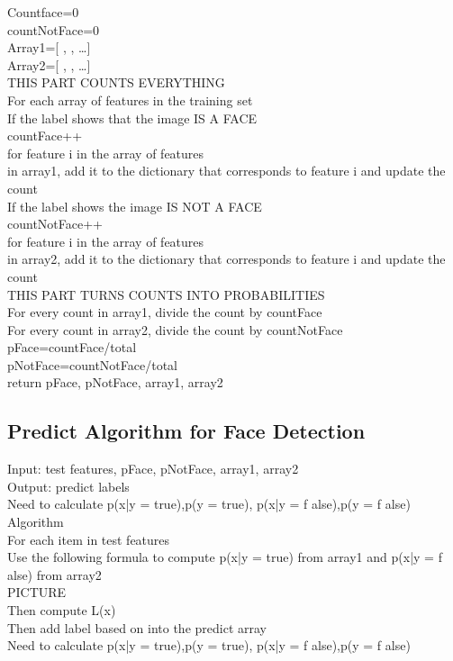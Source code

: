 \documentclass{article}
\begin{document}
Countface=0\\
countNotFace=0\\
Array1=[ {} ,  {}, {}…]\\
Array2=[ {} ,  {}, {}…]\\
THIS PART COUNTS EVERYTHING\\
For each array of features in the training set\\
	If the label shows that the image IS A FACE\\
		countFace++\\
		for feature i in the array of features\\
			in array1, add it to the dictionary that corresponds to feature i and update the count\\
	If the label shows the image IS NOT A FACE\\
		countNotFace++\\
		for feature i in the array of features\\
			in array2, add it to the dictionary that corresponds to feature i and update the count\\
THIS PART TURNS COUNTS INTO PROBABILITIES\\
For every count in array1, divide the count by countFace\\
For every count in array2, divide the count by countNotFace\\
pFace=countFace/total\\
pNotFace=countNotFace/total\\
return pFace, pNotFace, array1, array2\\ 
\subsection{Predict Algorithm for Face Detection}
Input: test features, pFace, pNotFace, array1, array2\\
Output: predict labels\\
Need to calculate p(x|y = true),p(y = true), p(x|y = f alse),p(y = f alse)\\

Algorithm\\
For each item in test features\\
	Use the following formula to compute p(x|y = true) from array1 and p(x|y = f alse) from array2\\
 	PICTURE\\
	Then compute L(x)\\
	Then add label based on into the predict array\\
Need to calculate p(x|y = true),p(y = true), p(x|y = f alse),p(y = f alse)\\
\end{document}
